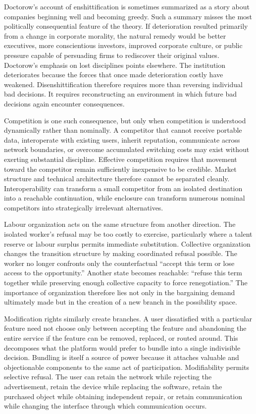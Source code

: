 \documentclass[11pt]{article}
\begin{document}
Doctorow's account of enshittification is sometimes summarized as a story about companies beginning well and becoming greedy. Such a summary misses the most politically consequential feature of the theory. If deterioration resulted primarily from a change in corporate morality, the natural remedy would be better executives, more conscientious investors, improved corporate culture, or public pressure capable of persuading firms to rediscover their original values. Doctorow's emphasis on lost disciplines points elsewhere. The institution deteriorates because the forces that once made deterioration costly have weakened. Disenshittification therefore requires more than reversing individual bad decisions. It requires reconstructing an environment in which future bad decisions again encounter consequences.

Competition is one such consequence, but only when competition is understood dynamically rather than nominally. A competitor that cannot receive portable data, interoperate with existing users, inherit reputation, communicate across network boundaries, or overcome accumulated switching costs may exist without exerting substantial discipline. Effective competition requires that movement toward the competitor remain sufficiently inexpensive to be credible. Market structure and technical architecture therefore cannot be separated cleanly. Interoperability can transform a small competitor from an isolated destination into a reachable continuation, while enclosure can transform numerous nominal competitors into strategically irrelevant alternatives.

Labour organization acts on the same structure from another direction. The isolated worker's refusal may be too costly to exercise, particularly where a talent reserve or labour surplus permits immediate substitution. Collective organization changes the transition structure by making coordinated refusal possible. The worker no longer confronts only the counterfactual ``accept this term or lose access to the opportunity.'' Another state becomes reachable: ``refuse this term together while preserving enough collective capacity to force renegotiation.'' The importance of organization therefore lies not only in the bargaining demand ultimately made but in the creation of a new branch in the possibility space.

Modification rights similarly create branches. A user dissatisfied with a particular feature need not choose only between accepting the feature and abandoning the entire service if the feature can be removed, replaced, or routed around. This decomposes what the platform would prefer to bundle into a single indivisible decision. Bundling is itself a source of power because it attaches valuable and objectionable components to the same act of participation. Modifiability permits selective refusal. The user can retain the network while rejecting the advertisement, retain the device while replacing the software, retain the purchased object while obtaining independent repair, or retain communication while changing the interface through which communication occurs.
\end{document}
